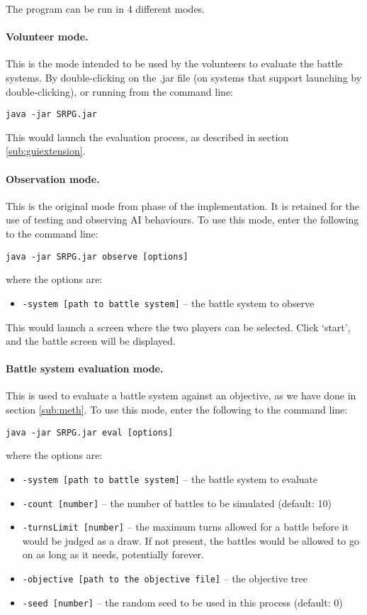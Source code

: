 The program can be run in 4 different modes.

\paragraph{Volunteer mode.} This is the mode intended to be used by the volunteers to evaluate the battle systems. By double-clicking on the .jar file (on systems that support launching by double-clicking), or running from the command line:
\begin{tcolorbox}
	\texttt{java -jar SRPG.jar}
\end{tcolorbox}
This would launch the evaluation process, as described in section \ref{sub:guiextension}.

\paragraph{Observation mode.} This is the original mode from phase  of the implementation. It is retained for the use of testing and observing AI behaviours. To use this mode, enter the following to the command line:
\begin{tcolorbox}
	\texttt{java -jar SRPG.jar observe [options]}
\end{tcolorbox}
where the options are:
\begin{itemize}
	\item \texttt{-system [path to battle system]} -- the battle system to observe
\end{itemize}
This would launch a screen where the two players can be selected. Click `start', and the battle screen will be displayed.

\paragraph{Battle system evaluation mode.} This is used to evaluate a battle system against an objective, as we have done in section \ref{sub:meth}. To use this mode, enter the following to the command line:
\begin{tcolorbox}
	\texttt{java -jar SRPG.jar eval [options]}
\end{tcolorbox}
where the options are:
\begin{itemize}
	\item \texttt{-system [path to battle system]} -- the battle system to evaluate
	\item \texttt{-count [number]} -- the number of battles to be simulated (default: 10)
	\item \texttt{-turnsLimit [number]} -- the maximum turns allowed for a battle before it would be judged as a draw. If not present, the battles would be allowed to go on as long as it needs, potentially forever.
	\item \texttt{-objective [path to the objective file]} -- the objective tree
	\item \texttt{-seed [number]} -- the random seed to be used in this process (default: 0)
\end{itemize}

